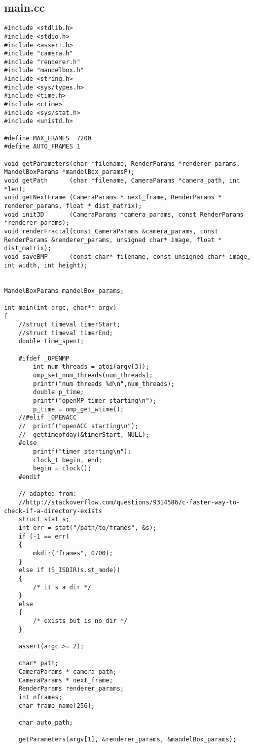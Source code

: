 \documentclass[]{article}
\begin{document}
\subsection*{main.cc}
\begin{Verbatim}[fontsize= \footnotesize, tabsize=4]
#include <stdlib.h>
#include <stdio.h>
#include <assert.h>
#include "camera.h"
#include "renderer.h"
#include "mandelbox.h"
#include <string.h>
#include <sys/types.h>
#include <time.h>
#include <ctime>
#include <sys/stat.h>
#include <unistd.h>

#define MAX_FRAMES  7200
#define AUTO_FRAMES 1

void getParameters(char *filename, RenderParams *renderer_params, MandelBoxParams *mandelBox_paramsP);
void getPath      (char *filename, CameraParams *camera_path, int *len);
void getNextFrame (CameraParams * next_frame, RenderParams * renderer_params, float * dist_matrix);
void init3D       (CameraParams *camera_params, const RenderParams *renderer_params);
void renderFractal(const CameraParams &camera_params, const RenderParams &renderer_params, unsigned char* image, float * dist_matrix);
void saveBMP      (const char* filename, const unsigned char* image, int width, int height);


MandelBoxParams mandelBox_params;

int main(int argc, char** argv)
{
	//struct timeval timerStart;
	//struct timeval timerEnd;
	double time_spent;

	#ifdef _OPENMP
		int num_threads = atoi(argv[3]);
		omp_set_num_threads(num_threads);
		printf("num threads %d\n",num_threads);
		double p_time;
		printf("openMP timer starting\n");
		p_time = omp_get_wtime();
	//#elif _OPENACC
	//	printf("openACC starting\n");
	//	gettimeofday(&timerStart, NULL);
	#else
		printf("timer starting\n");
		clock_t begin, end;
		begin = clock();
	#endif

	// adapted from:
	//http://stackoverflow.com/questions/9314586/c-faster-way-to-check-if-a-directory-exists
	struct stat s;
	int err = stat("/path/to/frames", &s);
	if (-1 == err)
	{
		mkdir("frames", 0700);
	}
	else if (S_ISDIR(s.st_mode))
	{
		/* it's a dir */
	}
	else
	{
		/* exists but is no dir */
	}

	assert(argc >= 2);

	char* path;
	CameraParams * camera_path;
	CameraParams * next_frame;
	RenderParams renderer_params;
	int nframes;
	char frame_name[256];

	char auto_path;

	getParameters(argv[1], &renderer_params, &mandelBox_params);


\end{Verbatim}
\end{document}
